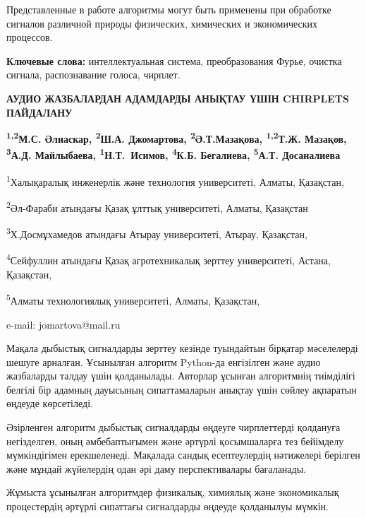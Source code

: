 Представленные в работе алгоритмы могут быть применены при обработке
сигналов различной природы физических, химических и экономических
процессов.

{\bfseries Ключевые слова:} интеллектуальная система, преобразования Фурье,
очистка сигнала, распознавание голоса, чирплет.

\begin{articleheader}
{\bfseries АУДИО ЖАЗБАЛАРДАН АДАМДАРДЫ АНЫҚТАУ ҮШІН CHIRPLETS ПАЙДАЛАНУ}

{\bfseries
\textsuperscript{1,2}М.С. Әлиаскар,
\textsuperscript{2}Ш.А. Джомартова\textsuperscript{\envelope },
\textsuperscript{2}Ә.Т.Мазақова,
\textsuperscript{1,2}Т.Ж. Мазақов,
\textsuperscript{3}А.Д. Майлыбаева,
\textsuperscript{1}Н.Т.~Исимов,
\textsuperscript{4}К.Б. Бегалиева,
\textsuperscript{5}А.Т. Досаналиева
}
\end{articleheader}

\begin{affiliation}
\textsuperscript{1}Халықаралық инженерлік және технология университеті, Алматы, Қазақстан,

\textsuperscript{2}Әл-Фараби атындағы Қазақ ұлттық университеті, Алматы, Қазақстан

\textsuperscript{3}Х.Досмұхамедов атындағы Атырау университеті, Атырау, Қазақстан,

\textsuperscript{4}Сейфуллин атындағы Қазақ агротехникалық зерттеу университеті, Астана, Қазақстан,

\textsuperscript{5}Алматы технологиялық университеті, Алматы, Қазақстан,

e-mail: jomartova@mail.ru
\end{affiliation}

Мақала дыбыстық сигналдарды зерттеу кезінде туындайтын бірқатар
мәселелерді шешуге арналған. Ұсынылған алгоритм Python-да енгізілген
және аудио жазбаларды талдау үшін қолданылады. Авторлар ұсынған
алгоритмнің тиімділігі белгілі бір адамның дауысының сипаттамаларын
анықтау үшін сөйлеу ақпаратын өңдеуде көрсетіледі.

Әзірленген алгоритм дыбыстық сигналдарды өңдеуге чирплеттерді қолдануға
негізделген, оның әмбебаптығымен және әртүрлі қосымшаларға тез бейімделу
мүмкіндігімен ерекшеленеді. Мақалада сандық есептеулердің нәтижелері
берілген және мұндай жүйелердің одан әрі даму перспективалары
бағаланады.

Жұмыста ұсынылған алгоритмдер физикалық, химиялық және экономикалық
процестердің әртүрлі сипаттағы сигналдарды өңдеуде қолданылуы мүмкін.

